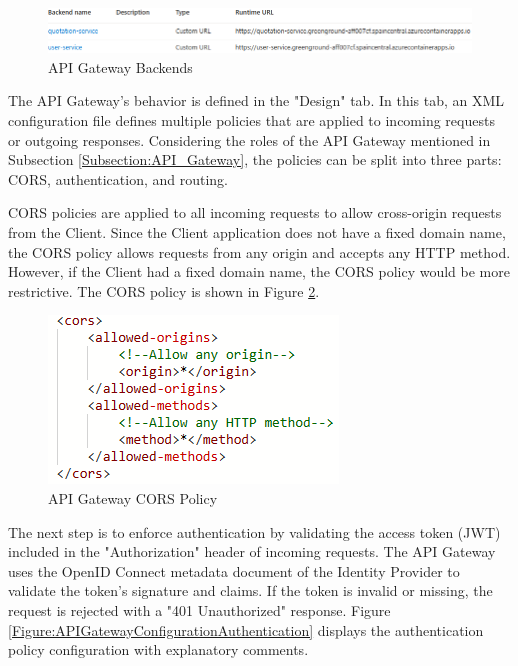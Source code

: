 \documentclass[12pt, reqno]{amsbook}
\theoremstyle{definition}
\theoremstyle{definition}
\numberwithin{section}{chapter}
\numberwithin{table}{chapter}
\numberwithin{figure}{chapter}
\begin{document}
\begin{figure}[H]
  \centering
  \includegraphics[width=1\linewidth]{images/APIGatewayBackends.png}
  \caption{\label{Figure:APIGatewayBackends}API Gateway Backends}
\end{figure}

The \ac{API} Gateway's behavior is defined in the "Design" tab. In this tab, an \ac{XML} configuration file defines multiple policies that are applied to incoming requests or outgoing responses. Considering the roles of the \ac{API} Gateway mentioned in Subsection \ref{Subsection:API_Gateway}, the policies can be split into three parts: \Ac{CORS}, authentication, and routing.

\ac{CORS} policies are applied to all incoming requests to allow cross-origin requests from the Client. Since the Client application does not have a fixed domain name, the \ac{CORS} policy allows requests from any origin and accepts any \ac{HTTP} method. However, if the Client had a fixed domain name, the \ac{CORS} policy would be more restrictive. The \ac{CORS} policy is shown in Figure \ref{Figure:APIGatewayConfigurationCORS}.

\begin{figure}[H]
  \centering
  \includegraphics[width=0.4\linewidth]{images/APIGatewayConfigurationCORS.png}
  \caption{\label{Figure:APIGatewayConfigurationCORS}API Gateway \ac{CORS} Policy}
\end{figure}

The next step is to enforce authentication by validating the access token (\ac{JWT}) included in the "Authorization" header of incoming requests. The \ac{API} Gateway uses the OpenID Connect metadata document of the Identity Provider to validate the token's signature and claims. If the token is invalid or missing, the request is rejected with a "401 Unauthorized" response. Figure \ref{Figure:APIGatewayConfigurationAuthentication} displays the authentication policy configuration with explanatory comments.
\end{document}
